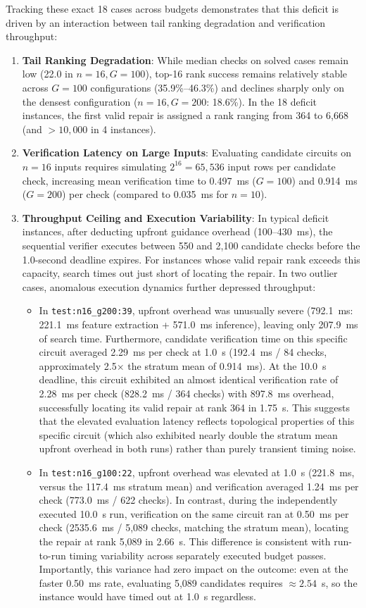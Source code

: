 \documentclass[11pt,a4paper]{article}
\begin{document}
Tracking these exact 18 cases across budgets demonstrates that this deficit is driven by an interaction between tail ranking degradation and verification throughput:
\begin{enumerate}
    \item \textbf{Tail Ranking Degradation}: While median checks on solved cases remain low (22.0 in $n=16, G=100$), top-16 rank success remains relatively stable across $G=100$ configurations (35.9\%--46.3\%) and declines sharply only on the densest configuration ($n=16, G=200$: 18.6\%). In the 18 deficit instances, the first valid repair is assigned a rank ranging from 364 to 6,668 (and $>10,000$ in 4 instances).
    \item \textbf{Verification Latency on Large Inputs}: Evaluating candidate circuits on $n=16$ inputs requires simulating $2^{16} = 65,536$ input rows per candidate check, increasing mean verification time to 0.497~ms ($G=100$) and 0.914~ms ($G=200$) per check (compared to 0.035~ms for $n=10$).
    \item \textbf{Throughput Ceiling and Execution Variability}: In typical deficit instances, after deducting upfront guidance overhead (100--430~ms), the sequential verifier executes between 550 and 2,100 candidate checks before the 1.0-second deadline expires. For instances whose valid repair rank exceeds this capacity, search times out just short of locating the repair. In two outlier cases, anomalous execution dynamics further depressed throughput:
    \begin{itemize}
        \item In \texttt{test:n16\_g200:39}, upfront overhead was unusually severe (792.1~ms: 221.1~ms feature extraction + 571.0~ms inference), leaving only 207.9~ms of search time. Furthermore, candidate verification time on this specific circuit averaged 2.29~ms per check at 1.0~s (192.4~ms / 84 checks, approximately 2.5$\times$ the stratum mean of 0.914~ms). At the 10.0~s deadline, this circuit exhibited an almost identical verification rate of 2.28~ms per check (828.2~ms / 364 checks) with 897.8~ms overhead, successfully locating its valid repair at rank 364 in 1.75~s. This suggests that the elevated evaluation latency reflects topological properties of this specific circuit (which also exhibited nearly double the stratum mean upfront overhead in both runs) rather than purely transient timing noise.
        \item In \texttt{test:n16\_g100:22}, upfront overhead was elevated at 1.0~s (221.8~ms, versus the 117.4~ms stratum mean) and verification averaged 1.24~ms per check (773.0~ms / 622 checks). In contrast, during the independently executed 10.0~s run, verification on the same circuit ran at 0.50~ms per check (2535.6~ms / 5,089 checks, matching the stratum mean), locating the repair at rank 5,089 in 2.66~s. This difference is consistent with run-to-run timing variability across separately executed budget passes. Importantly, this variance had zero impact on the outcome: even at the faster 0.50~ms rate, evaluating 5,089 candidates requires $\approx 2.54$~s, so the instance would have timed out at 1.0~s regardless.

\end{itemize}
\end{enumerate}
\end{document}
